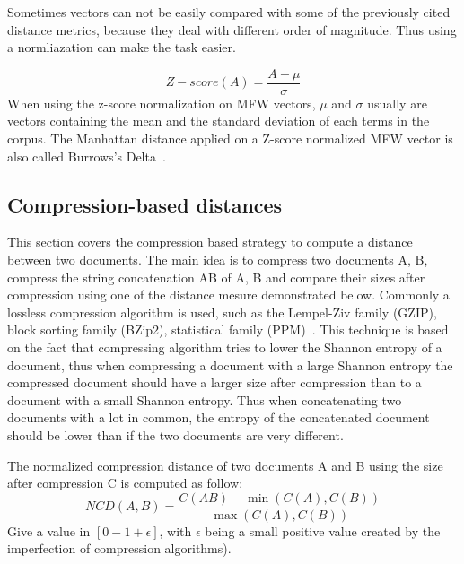 Sometimes vectors can not be easily compared with some of the previously cited distance metrics, because they deal with different order of magnitude.
Thus using a normliazation can make the task easier.

\begin{definition}
  \begin{equation}
    Z-score(A) = \frac{A - \mu}{\sigma}
  \end{equation}
  When using the z-score normalization on MFW vectors, $\mu$ and $\sigma$ usually are vectors containing the mean and the standard deviation of each terms in the corpus.
  The Manhattan distance applied on a Z-score normalized MFW vector is also called Burrows's Delta~\cite{savoy_stylo}.
\end{definition}

\subsection{Compression-based distances}

This section covers the compression based strategy to compute a distance between two documents.
The main idea is to compress two documents A, B, compress the string concatenation AB of A, B and compare their sizes after compression using one of the distance mesure demonstrated below.
Commonly a lossless compression algorithm is used, such as the Lempel-Ziv family (GZIP), block sorting family (BZip2), statistical family (PPM)~\cite{comparing_compression}.
This technique is based on the fact that compressing algorithm tries to lower the Shannon entropy of a document, thus when compressing a document with a large Shannon entropy the compressed document should have a larger size after compression than to a document with a small Shannon entropy.
Thus when concatenating two documents with a lot in common, the entropy of the concatenated document should be lower than if the two documents are very different.

\begin{definition}
  The normalized compression distance of two documents A and B using the size after compression C is computed as follow:
  \begin{equation}
    NCD(A, B) = \frac{C(AB) - \min(C(A), C(B))}{\max(C(A), C(B))}
  \end{equation}
  Give a value in $\left[0-1+\epsilon\right]$, with $\epsilon$ being a small positive value created by the imperfection of compression algorithms).
\end{definition}

